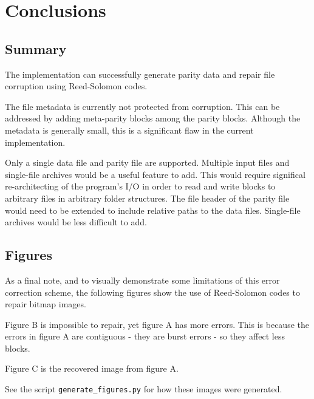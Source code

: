 \chapter{Conclusions}

\section{Summary}

The implementation can successfully generate parity data and repair file corruption using Reed-Solomon codes.

The file metadata is currently not protected from corruption.
This can be addressed by adding meta-parity blocks among the parity blocks.
Although the metadata is generally small, this is a significant flaw in the current implementation.

Only a single data file and parity file are supported. Multiple input files and single-file archives would be a useful feature to add.
This would require significal re-architecting of the program's I/O in order to read and write blocks to arbitrary files in arbitrary folder structures.
The file header of the parity file would need to be extended to include relative paths to the data files.
Single-file archives would be less difficult to add.

\pagebreak

\section{Figures}


As a final note, and to visually demonstrate some limitations of this error correction scheme,
the following figures show the use of Reed-Solomon codes to repair bitmap images.

Figure B is impossible to repair, yet figure A has more errors.
This is because the errors in figure A are contiguous - they are burst errors - so they affect less blocks.

Figure C is the recovered image from figure A.

See the script \texttt{generate\_figures.py} for how these images were generated.


